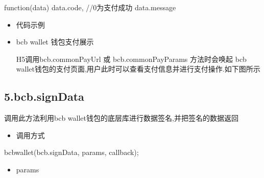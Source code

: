 \documentclass[letterpaper,10pt,english]{sphinxmanual}
\begin{document}
\begin{sphinxVerbatim}[commandchars=\\\{\}]
function(data) \PYGZob{}
  data.code, //0为支付成功
      data.message
\PYGZcb{}
\end{sphinxVerbatim}
\begin{itemize}
\item {} 
代码示例

\begin{sphinxVerbatim}[commandchars=\\\{\}]
    
\end{sphinxVerbatim}

\item {} 
bcb wallet 钱包支付展示

H5调用bcb.commonPayUrl 或 bcb.commonPayParams 方法时会唤起 bcb wallet钱包的支付页面,用户此时可以查看支付信息并进行支付操作.如下图所示


\end{itemize}


\subsection{5.bcb.signData}
\label{\detokenize{jsapi:bcb-signdata}}
调用此方法利用bcb wallet钱包的底层库进行数据签名,并把签名的数据返回
\begin{itemize}
\item {} 
调用方式

\end{itemize}

\begin{sphinxVerbatim}[commandchars=\\\{\}]
bcbwallet(\PYGZsq{}bcb.signData\PYGZsq{}, params, callback);
\end{sphinxVerbatim}
\begin{itemize}
\item {} 
params

\end{itemize}
\end{document}
